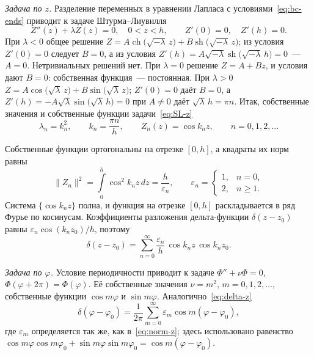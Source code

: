 \emph{Задача по $z$.} Разделение переменных в уравнении Лапласа
с условиями~\eqref{eq:bc-ends} приводит к задаче Штурма--Лиувилля
\begin{equation}
\label{eq:SL-z}
Z''(z)+\lambda Z(z)=0,\quad 0<z<h,\qquad Z'(0)=0,\quad Z'(h)=0 .
\end{equation}
При $\lambda<0$ общее решение
$Z=A\operatorname{ch}\bigl(\sqrt{-\lambda}\,z\bigr)+B\operatorname{sh}\bigl(\sqrt{-\lambda}\,z\bigr)$;
из условия $Z'(0)=0$ следует $B=0$, а из условия
$Z'(h)=A\sqrt{-\lambda}\operatorname{sh}\bigl(\sqrt{-\lambda}\,h\bigr)=0$~— $A=0$.
Нетривиальных решений нет. При $\lambda=0$ решение $Z=A+Bz$, и условия
дают $B=0$: собственная функция~— постоянная. При $\lambda>0$
$Z=A\cos\bigl(\sqrt\lambda\,z\bigr)+B\sin\bigl(\sqrt\lambda\,z\bigr)$;
$Z'(0)=0$ даёт $B=0$, а $Z'(h)=-A\sqrt\lambda\sin\bigl(\sqrt\lambda\,h\bigr)=0$
при $A\ne0$ даёт $\sqrt\lambda\,h=\pi n$. Итак, собственные значения
и собственные функции задачи~\eqref{eq:SL-z}
\begin{equation}
\label{eq:eigen-z}
\lambda_n=k_n^2,\qquad k_n=\frac{\pi n}{h},\qquad
Z_n(z)=\cos k_n z,\qquad n=0,1,2,\dots
\end{equation}

Собственные функции ортогональны на отрезке $[0,h]$, а квадраты их норм
равны
\begin{equation}
\label{eq:norm-z}
\|Z_n\|^2=\int\limits_0^h\cos^2 k_n z\,dz=\frac{h}{\varepsilon_n},\qquad
\varepsilon_n=
\begin{cases}
1, & n=0,\\
2, & n\ge 1 .
\end{cases}
\end{equation}
Система $\{\cos k_n z\}$ полна, и функция на отрезке $[0,h]$ раскладывается
в ряд Фурье по косинусам. Коэффициенты разложения дельта-функции
$\delta(z-z_0)$ равны $\varepsilon_n\cos(k_n z_0)/h$, поэтому
\begin{equation}
\label{eq:delta-z}
\delta(z-z_0)=\sum_{n=0}^{\infty}\frac{\varepsilon_n}{h}\,
\cos k_n z\,\cos k_n z_0 .
\end{equation}

\emph{Задача по $\varphi$.} Условие периодичности приводит к задаче
$\Phi''+\nu\Phi=0$, $\Phi(\varphi+2\pi)=\Phi(\varphi)$. Её собственные
значения $\nu=m^2$, $m=0,1,2,\dots$, собственные функции $\cos m\varphi$
и $\sin m\varphi$. Аналогично~\eqref{eq:delta-z}
\begin{equation}
\label{eq:delta-phi}
\delta(\varphi-\varphi_0)=\frac{1}{2\pi}\sum_{m=0}^{\infty}
\varepsilon_m\cos m(\varphi-\varphi_0),
\end{equation}
где $\varepsilon_m$ определяется так же, как в~\eqref{eq:norm-z}; здесь
использовано равенство
$\cos m\varphi\cos m\varphi_0+\sin m\varphi\sin m\varphi_0
=\cos m(\varphi-\varphi_0)$.

